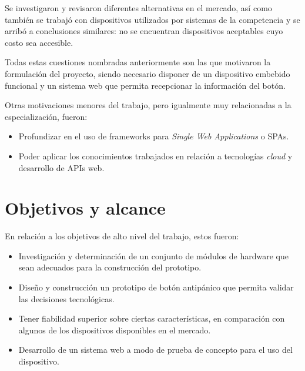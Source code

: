 Se investigaron y revisaron diferentes alternativas en el mercado, así como también se trabajó con dispositivos utilizados por sistemas de la competencia y se arribó a conclusiones similares: no se encuentran dispositivos aceptables cuyo costo sea accesible.

Todas estas cuestiones nombradas anteriormente son las que motivaron la formulación del proyecto, siendo necesario disponer de un dispositivo embebido funcional y un sistema web que permita recepcionar la información del botón.

Otras motivaciones menores del trabajo, pero igualmente muy relacionadas a la especialización, fueron:
\begin{itemize}
\item Profundizar en el uso de frameworks para \textit{Single Web Applications} o SPAs.
\item Poder aplicar los conocimientos trabajados en relación a tecnologías \textit{cloud} y desarrollo de APIs web.
\end{itemize}


\section{Objetivos y alcance}

En relación a los objetivos de alto nivel del trabajo, estos fueron:
\begin{itemize}
\item Investigación y determinación de un conjunto de módulos de hardware que sean adecuados para la construcción del prototipo.
\item Diseño y construcción un prototipo de botón antipánico que permita validar las decisiones tecnológicas.
\item Tener fiabilidad superior sobre ciertas características, en comparación con algunos de los dispositivos disponibles en el mercado.
\item Desarrollo de un sistema web a modo de prueba de concepto para el uso del dispositivo.
\end{itemize}

